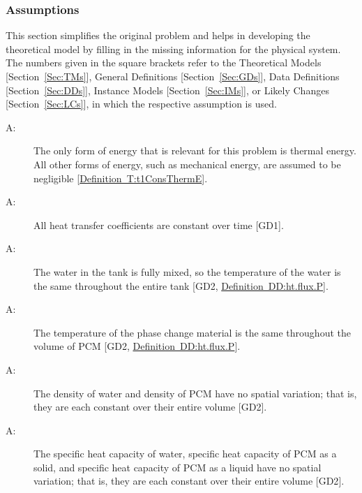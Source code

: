 \documentclass[12pt]{article}
\newcounter{assumpnum}
\newcommand{\atheassumpnum}{A\theassumpnum}
\begin{document}
\subsubsection{Assumptions}
\label{Sec:Assumps}
This section simplifies the original problem and helps in developing the theoretical model by filling in the missing information for the physical system. The numbers given in the square brackets refer to the Theoretical Models {[}Section~\ref{Sec:TMs}{]}, General Definitions {[}Section~\ref{Sec:GDs}{]}, Data Definitions {[}Section~\ref{Sec:DDs}{]}, Instance Models {[}Section~\ref{Sec:IMs}{]}, or Likely Changes {[}Section~\ref{Sec:LCs}{]}, in which the respective assumption is used.
\begin{description}
\item[\atheassumpnum\label{A:assump1}:]The only form of energy that is relevant for this problem is thermal energy. All other forms of energy, such as mechanical energy, are assumed to be negligible {[}\hyperref[T:t1ConsThermE]{Definition~T:t1ConsThermE}{]}.
\end{description}
\begin{description}
\item[\atheassumpnum\label{A:assump2}:]All heat transfer coefficients are constant over time {[}GD1{]}.
\end{description}
\begin{description}
\item[\atheassumpnum\label{A:assump3}:]The water in the tank is fully mixed, so the temperature of the water is the same throughout the entire tank {[}GD2, \hyperref[DD:ht.flux.P]{Definition~DD:ht.flux.P}{]}.
\end{description}
\begin{description}
\item[\atheassumpnum\label{A:assump4}:]The temperature of the phase change material is the same throughout the volume of PCM {[}GD2, \hyperref[DD:ht.flux.P]{Definition~DD:ht.flux.P}{]}.
\end{description}
\begin{description}
\item[\atheassumpnum\label{A:assump5}:]The density of water and density of PCM have no spatial variation; that is, they are each constant over their entire volume {[}GD2{]}.
\end{description}
\begin{description}
\item[\atheassumpnum\label{A:assump6}:]The specific heat capacity of water, specific heat capacity of PCM as a solid, and specific heat capacity of PCM as a liquid have no spatial variation; that is, they are each constant over their entire volume {[}GD2{]}.
\end{description}
\end{document}

